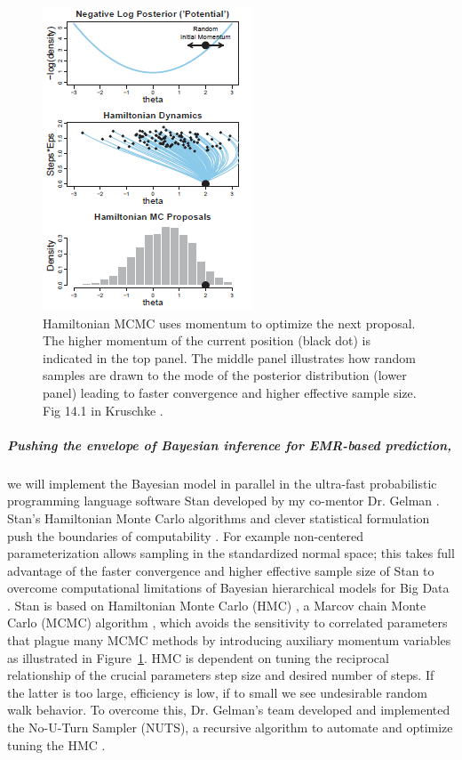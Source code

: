 \documentclass[11pt,notitlepage]{article}
\begin{document}
\begin{figure}
 \vspace{-90pt}
 \includegraphics[scale=1]{Figures/Hamiltonian.png}
  \vspace{-30pt}
  \caption{\footnotesize Hamiltonian MCMC uses momentum to optimize the next proposal. The higher momentum of the current position (black dot) is indicated in the top panel. The middle panel illustrates how random samples are drawn to the mode of the posterior distribution (lower panel) leading to faster convergence and higher effective sample size. Fig 14.1 in Kruschke \cite{Kruschke_Book_2014}.}
    \label{fig:Hamiltonian}
 \vspace{- 10 pt}
\end{figure}

\subparagraph{Pushing the envelope of Bayesian inference for EMR-based prediction,}
we will implement the Bayesian model in parallel in the ultra-fast probabilistic programming language software Stan developed by my co-mentor Dr. Gelman \cite{Stan_Software_2014}. Stan's Hamiltonian Monte Carlo algorithms \cite{Stan_Software_2014} and clever statistical formulation push the boundaries of computability \cite{Gelman-Hill_2014}. For example non-centered parameterization allows sampling in the standardized normal space; this takes full advantage of the faster convergence and higher effective sample size of Stan to overcome computational limitations of Bayesian hierarchical models for Big Data \cite{Gelman-Hill_2014}. Stan  is based on Hamiltonian Monte Carlo (HMC) \cite{Gelman-Hill_2014}, a Marcov chain Monte Carlo (MCMC) algorithm \cite{StanislawUlam_1949}, which avoids the sensitivity to correlated parameters that plague many MCMC methods by introducing auxiliary momentum variables \cite{Homan_Gelman_NUTS_2014} as illustrated in Figure~\ref{fig:Hamiltonian}. HMC is dependent  on tuning the reciprocal relationship of the crucial parameters step size and desired number of steps. If the latter is too large, efficiency is low, if to small we see undesirable random walk behavior. To overcome this, Dr. Gelman's team developed and implemented the No-U-Turn Sampler (NUTS), a recursive algorithm to automate and optimize tuning the HMC \cite{Homan_Gelman_NUTS_2014}.
  
\end{document}
